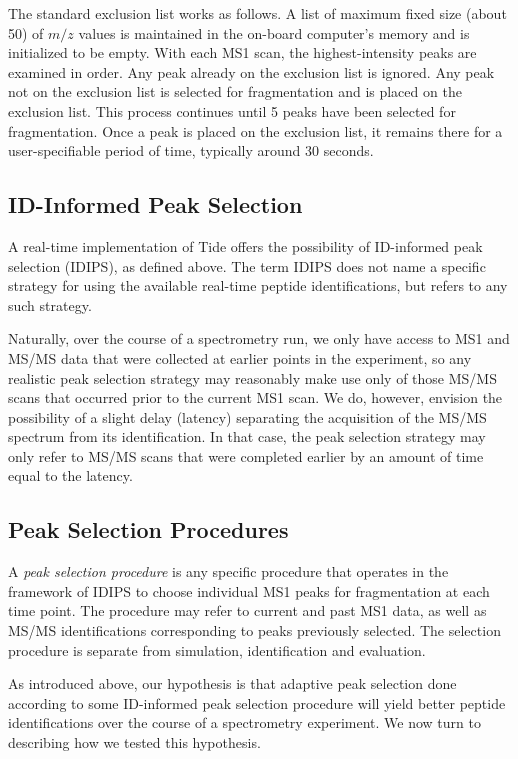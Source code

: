 \documentclass[12pt,twoside,openright]{report}
\begin{document}
The standard exclusion list works as follows. A list of maximum fixed size
(about 50) of $m/z$ values is maintained in the on-board computer's memory and
is initialized to be empty. With each MS1 scan, the highest-intensity peaks are
examined in order. Any peak already on the exclusion list is ignored. Any peak
not on the exclusion list is selected for fragmentation and is placed on the
exclusion list. This process continues until 5 peaks have been selected for
fragmentation. Once a peak is placed on the exclusion list, it remains there for
a user-specifiable period of time, typically around 30 seconds.

\subsection{ID-Informed Peak Selection}

A real-time implementation of Tide offers the possibility of ID-informed peak
selection (IDIPS), as defined above. The term IDIPS does not name a specific
strategy for using the available real-time peptide identifications, but refers
to any such strategy.

Naturally, over the course of a spectrometry run, we only have access to MS1 and
MS/MS data that were collected at earlier points in the experiment, so any
realistic peak selection strategy may reasonably make use only of those MS/MS
scans that occurred prior to the current MS1 scan. We do, however, envision the
possibility of a slight delay (latency) separating the acquisition of the MS/MS
spectrum from its identification. In that case, the peak selection strategy may
only refer to MS/MS scans that were completed earlier by an amount of time equal
to the latency.

\subsection{Peak Selection Procedures}

A {\it peak selection procedure} is any specific procedure that operates in the
framework of IDIPS to choose individual MS1 peaks for
fragmentation at each time point. The procedure may refer to current and past
MS1 data, as well as MS/MS identifications corresponding to peaks previously
selected. The selection procedure is separate from simulation, identification
and evaluation.

As introduced above, our hypothesis is that adaptive peak selection done
according to some ID-informed peak selection procedure will yield better peptide
identifications over the course of a spectrometry experiment. We now turn to
describing how we tested this hypothesis.
\end{document}
